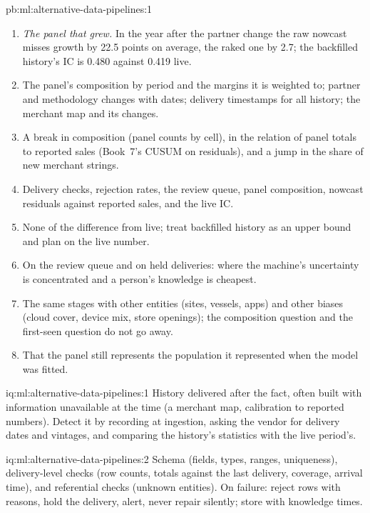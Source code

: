 \begin{solution}{pb:ml:alternative-data-pipelines:1}
\begin{enumerate}[resume]
\item \emph{The panel that grew.} In the year after the partner change the raw nowcast misses growth by 22.5 points on
average, the raked one by 2.7; the backfilled history's IC is 0.480 against 0.419 live.
\item The panel's composition by period and the margins it is weighted to; partner and methodology changes with dates;
delivery timestamps for all history; the merchant map and its changes.
\item A break in composition (panel counts by cell), in the relation of panel totals to reported sales (Book~7's CUSUM on
residuals), and a jump in the share of new merchant strings.
\item Delivery checks, rejection rates, the review queue, panel composition, nowcast residuals against reported sales, and
the live IC.
\item None of the difference from live; treat backfilled history as an upper bound and plan on the live number.
\item On the review queue and on held deliveries: where the machine's uncertainty is concentrated and a person's knowledge
is cheapest.
\item The same stages with other entities (sites, vessels, apps) and other biases (cloud cover, device mix, store
openings); the composition question and the first-seen question do not go away.
\item That the panel still represents the population it represented when the model was fitted.
\end{enumerate}
\end{solution}

\begin{solution}{iq:ml:alternative-data-pipelines:1}
History delivered after the fact, often built with information unavailable at the time (a merchant map, calibration to
reported numbers). Detect it by recording  at ingestion, asking the vendor for delivery dates and
vintages, and comparing the history's statistics with the live period's.
\end{solution}

\begin{solution}{iq:ml:alternative-data-pipelines:2}
Schema (fields, types, ranges, uniqueness), delivery-level checks (row counts, totals against the last delivery, coverage,
arrival time), and referential checks (unknown entities). On failure: reject rows with reasons, hold the delivery, alert,
never repair silently; store with knowledge times.
\end{solution}

